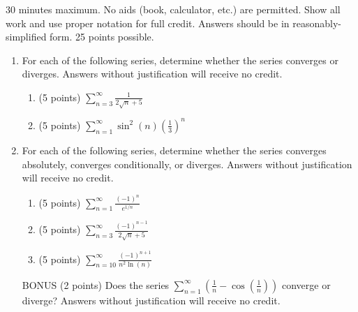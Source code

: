 \documentclass[12pt]{article}
\newcommand{\ds}{\displaystyle}
\begin{document}
30 minutes maximum.  No aids (book, calculator, etc.) are permitted.
Show all work and use proper notation for full credit.  Answers should
be in reasonably-simplified form.  25 points possible.

\begin{enumerate}

\item For each of the following series, determine whether the series
  converges or diverges. Answers without justification will receive no
  credit.

  \begin{enumerate}
  \item (5 points) $\ds \sum_{n=3}^{\infty} \frac{1}{2\sqrt{n}+5}$
    \vfill

  \item (5 points) $\ds \sum_{n=1}^{\infty} \sin^2(n) \left( \frac{1}{3} \right)^n$
    \vfill

  \end{enumerate}

  \newpage
  
\item For each of the following series, determine whether the series
  converges absolutely, converges conditionally, or diverges. Answers
  without justification will receive no credit.

  \begin{enumerate}
  \item (5 points) $\ds \sum_{n=1}^{\infty} \frac{(-1)^n}{e^{1/n}}$
    \vfill

  \item (5 points) $\ds \sum_{n=3}^{\infty} \frac{(-1)^{n-1}}{2 \sqrt{n} +5}$
    \vfill

  \item (5 points) $\ds \sum_{n=10}^{\infty} \frac{(-1)^{n+1}}{n^2 \ln(n)}$
    \vfill
  \end{enumerate}

  \newpage

  BONUS (2 points) Does the series $\ds \sum_{n=1}^{\infty} \left( \frac{1}{n} -
    \cos\left(\frac{1}{n}\right) \right)$ converge or diverge? Answers
  without justification will receive no credit.
  

\end{enumerate}
\end{document}
